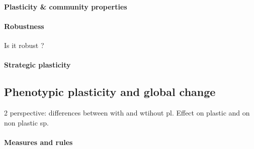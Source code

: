 


\paragraph{Plasticity \& community properties}


\paragraph{Robustness}

Is it robust ?
\cite{roscher_contrasting_2015}

\paragraph{Strategic plasticity}



\subsection{Phenotypic plasticity and global change}

2 perspective: differences between with and wtihout pl. Effect on plastic and on non plastic sp.








\paragraph{Measures and rules}


